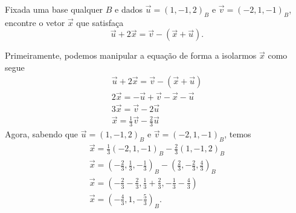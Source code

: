 \begin{exeresol}
  Fixada uma base qualquer $B$ e dados $\vec{u}=(1,-1,2)_B$ e $\vec{v}=(-2,1,-1)_B$, encontre o vetor $\vec{x}$ que satisfaça
  \begin{equation}
    \vec{u}+2\vec{x}=\vec{v}-\left(\vec{x}+\vec{u}\right).
  \end{equation}
\end{exeresol}
\begin{exeresol}
  Primeiramente, podemos manipular a equação de forma a isolarmos $\vec{x}$ como segue
  \begin{gather}
    \vec{u}+2\vec{x}=\vec{v}-\left(\vec{x}+\vec{u}\right)\\
    2\vec{x}=-\vec{u}+\vec{v}-\vec{x}-\vec{u}\\
    3\vec{x}=\vec{v}-2\vec{u}\\
    \vec{x}=\frac{1}{3}\vec{v}-\frac{2}{3}\vec{u}
  \end{gather}
  Agora, sabendo que $\vec{u}=(1,-1,2)_B$ e $\vec{v}=(-2,1,-1)_B$, temos
  \begin{gather}
    \vec{x}=\frac{1}{3}(-2,1,-1)_B-\frac{2}{3}(1,-1,2)_B\\
    \vec{x}=\left(-\frac{2}{3},\frac{1}{3},-\frac{1}{3}\right)_B-\left(\frac{2}{3},-\frac{2}{3},\frac{4}{3}\right)_B\\
    \vec{x}=\left(-\frac{2}{3}-\frac{2}{3},\frac{1}{3}+\frac{2}{3},-\frac{1}{3}-\frac{4}{3}\right)\\
    \vec{x}=\left(-\frac{4}{3},1,-\frac{5}{3}\right)_B.
  \end{gather}
\end{exeresol}

